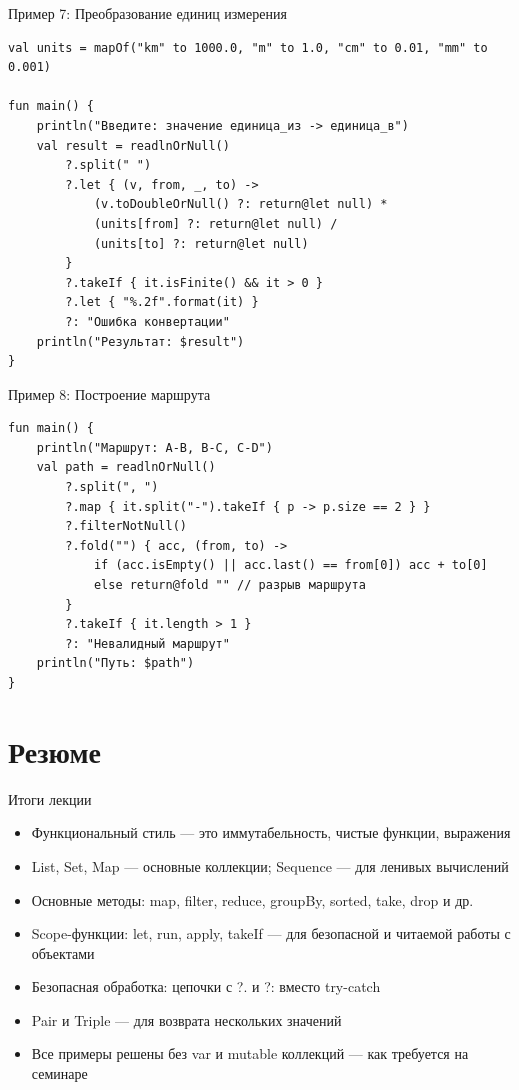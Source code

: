 \documentclass[aspectratio=169]{beamer}
\begin{document}
\begin{frame}[fragile]{Пример 7: Преобразование единиц измерения}
\lstset{language=Kotlin}
\begin{lstlisting}
val units = mapOf("km" to 1000.0, "m" to 1.0, "cm" to 0.01, "mm" to 0.001)

fun main() {
    println("Введите: значение единица_из -> единица_в")
    val result = readlnOrNull()
        ?.split(" ")
        ?.let { (v, from, _, to) ->
            (v.toDoubleOrNull() ?: return@let null) *
            (units[from] ?: return@let null) /
            (units[to] ?: return@let null)
        }
        ?.takeIf { it.isFinite() && it > 0 }
        ?.let { "%.2f".format(it) }
        ?: "Ошибка конвертации"
    println("Результат: $result")
}
\end{lstlisting}
\end{frame}

\begin{frame}[fragile]{Пример 8: Построение маршрута}
\lstset{language=Kotlin}
\begin{lstlisting}
fun main() {
    println("Маршрут: A-B, B-C, C-D")
    val path = readlnOrNull()
        ?.split(", ")
        ?.map { it.split("-").takeIf { p -> p.size == 2 } }
        ?.filterNotNull()
        ?.fold("") { acc, (from, to) ->
            if (acc.isEmpty() || acc.last() == from[0]) acc + to[0]
            else return@fold "" // разрыв маршрута
        }
        ?.takeIf { it.length > 1 }
        ?: "Невалидный маршрут"
    println("Путь: $path")
}
\end{lstlisting}
\end{frame}
\section{Резюме}

\begin{frame}{Итоги лекции}
  \begin{itemize}
    \item Функциональный стиль — это иммутабельность, чистые функции, выражения
    \item List, Set, Map — основные коллекции; Sequence — для ленивых вычислений
    \item Основные методы: map, filter, reduce, groupBy, sorted, take, drop и др.
    \item Scope-функции: let, run, apply, takeIf — для безопасной и читаемой работы с объектами
    \item Безопасная обработка: цепочки с ?. и ?: вместо try-catch
    \item Pair и Triple — для возврата нескольких значений
    \item Все примеры решены без var и mutable коллекций — как требуется на семинаре
  \end{itemize}
\end{frame}
\end{document}
